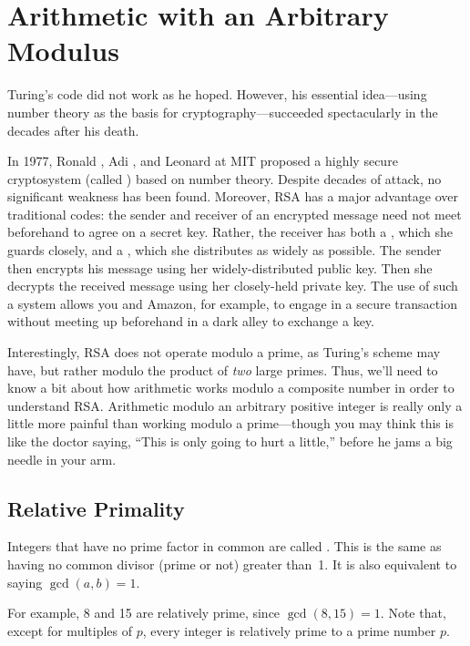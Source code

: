 \section{Arithmetic with an Arbitrary Modulus}\label{arithmetic_modn_sec}

Turing's code did not work as he hoped.  However, his essential
idea---using number theory as the basis for cryptography---succeeded
spectacularly in the decades after his death.

In 1977, Ronald , Adi , and
Leonard  at MIT proposed a highly secure cryptosystem
(called \textbf{}) based on number theory.  Despite decades
of attack, no significant weakness has been found.  Moreover, RSA has
a major advantage over traditional codes: the sender and receiver of
an encrypted message need not meet beforehand to agree on a secret
key.  Rather, the receiver has both a , which she
guards closely, and a , which she distributes as
widely as possible.  The sender then encrypts his message using her
widely-distributed public key.  Then she decrypts the received message
using her closely-held private key.  The use of such a  system allows you and Amazon, for example, to engage
in a secure transaction without meeting up beforehand in a dark alley
to exchange a key.

Interestingly, RSA does not operate modulo a prime, as Turing's scheme
may have, but rather modulo the product of \emph{two} large primes.
Thus, we'll need to know a bit about how arithmetic works modulo a
composite number in order to understand RSA.  Arithmetic modulo an
arbitrary positive integer is really only a little more painful than
working modulo a prime---though you may think this is like
the doctor saying, ``This is only going to hurt a little,'' before he
jams a big needle in your arm.

\subsection{Relative Primality}

Integers that have no prime factor in common are called
.  This is the same as having no common divisor
(prime or not) greater than~1.  It is also equivalent to saying
$\gcd(a, b) = 1$.

For example, 8 and 15 are relatively prime, since $\gcd(8, 15) = 1$.
Note that, except for multiples of $p$, every integer is relatively
prime to a prime number $p$.

